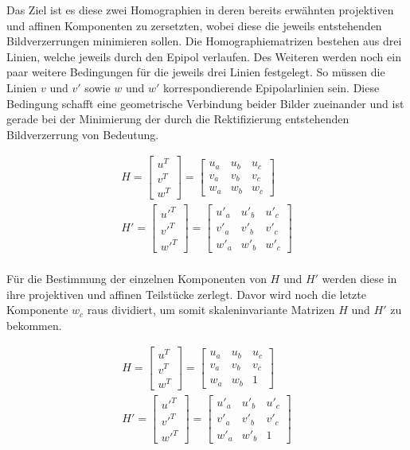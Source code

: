Das Ziel ist es diese zwei Homographien in deren bereits erwähnten projektiven und affinen Komponenten zu zersetzten, wobei diese die jeweils entstehenden Bildverzerrungen minimieren sollen. Die Homographiematrizen bestehen aus drei Linien, welche jeweils durch den Epipol verlaufen. Des Weiteren werden noch ein paar weitere Bedingungen für die jeweils drei Linien festgelegt. So müssen die Linien $v$ und $v'$ sowie $w$ und $w'$ korrespondierende Epipolarlinien sein. Diese Bedingung schafft eine geometrische Verbindung beider Bilder zueinander und ist gerade bei der Minimierung der durch die Rektifizierung entstehenden Bildverzerrung von Bedeutung.

\begin{gather}
H = \begin{bmatrix}
u^T\\v^T\\w^T
\end{bmatrix} =
\begin{bmatrix}
u_a&u_b&u_c\\
v_a&v_b&v_c\\
w_a&w_b&w_c
\end{bmatrix}\\
H' = \begin{bmatrix}
u'^T\\v'^T\\w'^T
\end{bmatrix} =
\begin{bmatrix}
u'_a&u'_b&u'_c\\
v'_a&v'_b&v'_c\\
w'_a&w'_b&w'_c
\end{bmatrix}	
\end{gather}\\

Für die Bestimmung der einzelnen Komponenten von $H$ und $H'$ werden diese in ihre projektiven und affinen Teilstücke zerlegt. Davor wird noch die letzte Komponente $w_c$ raus dividiert, um somit  skaleninvariante Matrizen $H$ und $H'$ zu bekommen. 

\begin{gather}
H = \begin{bmatrix}
u^T\\v^T\\w^T
\end{bmatrix} =
\begin{bmatrix}
u_a&u_b&u_c\\
v_a&v_b&v_c\\
w_a&w_b&1
\end{bmatrix}\\
H' = \begin{bmatrix}
u'^T\\v'^T\\w'^T
\end{bmatrix} =
\begin{bmatrix}
u'_a&u'_b&u'_c\\
v'_a&v'_b&v'_c\\
w'_a&w'_b&1
\end{bmatrix}	
\end{gather}\\

